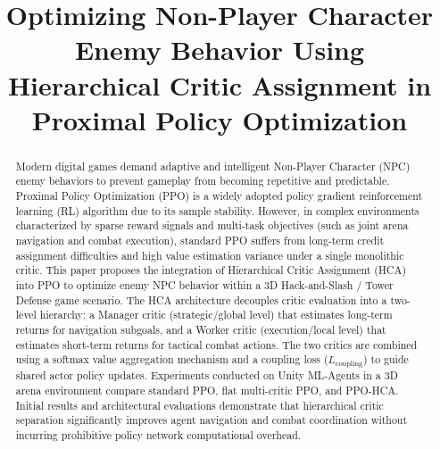\documentclass[conference]{IEEEtran}
\begin{document}
\title{Optimizing Non-Player Character Enemy Behavior Using Hierarchical Critic Assignment in Proximal Policy Optimization}

\author{
\and
{}
}

\maketitle

\begin{abstract}
Modern digital games demand adaptive and intelligent Non-Player Character (NPC) enemy behaviors to prevent gameplay from becoming repetitive and predictable. Proximal Policy Optimization (PPO) is a widely adopted policy gradient reinforcement learning (RL) algorithm due to its sample stability. However, in complex environments characterized by sparse reward signals and multi-task objectives (such as joint arena navigation and combat execution), standard PPO suffers from long-term credit assignment difficulties and high value estimation variance under a single monolithic critic. This paper proposes the integration of Hierarchical Critic Assignment (HCA) into PPO to optimize enemy NPC behavior within a 3D Hack-and-Slash / Tower Defense game scenario. The HCA architecture decouples critic evaluation into a two-level hierarchy: a Manager critic (strategic/global level) that estimates long-term returns for navigation subgoals, and a Worker critic (execution/local level) that estimates short-term returns for tactical combat actions. The two critics are combined using a softmax value aggregation mechanism and a coupling loss (\(L_{\text{coupling}}\)) to guide shared actor policy updates. Experiments conducted on Unity ML-Agents in a 3D arena environment compare standard PPO, flat multi-critic PPO, and PPO-HCA. Initial results and architectural evaluations demonstrate that hierarchical critic separation significantly improves agent navigation and combat coordination without incurring prohibitive policy network computational overhead.
\end{abstract}
\end{document}
